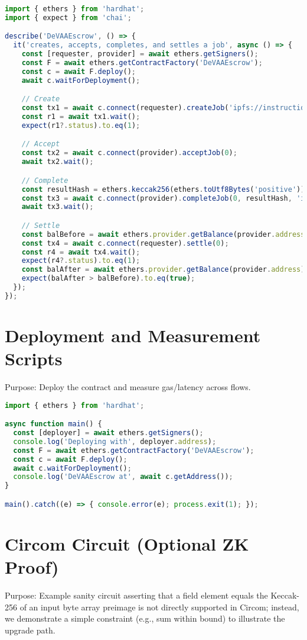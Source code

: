 \begin{lstlisting}[language=TypeScript,caption={test/devAA.test.ts}]
import { ethers } from 'hardhat';
import { expect } from 'chai';

describe('DeVAAEscrow', () => {
  it('creates, accepts, completes, and settles a job', async () => {
    const [requester, provider] = await ethers.getSigners();
    const F = await ethers.getContractFactory('DeVAAEscrow');
    const c = await F.deploy();
    await c.waitForDeployment();

    // Create
    const tx1 = await c.connect(requester).createJob('ipfs://instructions', { value: ethers.parseEther('0.01') });
    const r1 = await tx1.wait();
    expect(r1?.status).to.eq(1);

    // Accept
    const tx2 = await c.connect(provider).acceptJob(0);
    await tx2.wait();

    // Complete
    const resultHash = ethers.keccak256(ethers.toUtf8Bytes('positive'));
    const tx3 = await c.connect(provider).completeJob(0, resultHash, 'ipfs://artifact');
    await tx3.wait();

    // Settle
    const balBefore = await ethers.provider.getBalance(provider.address);
    const tx4 = await c.connect(requester).settle(0);
    const r4 = await tx4.wait();
    expect(r4?.status).to.eq(1);
    const balAfter = await ethers.provider.getBalance(provider.address);
    expect(balAfter > balBefore).to.eq(true);
  });
});
\end{lstlisting}

\section{Deployment and Measurement Scripts}
\noindent Purpose: Deploy the contract and measure gas/latency across flows.

\begin{lstlisting}[language=TypeScript,caption={scripts/deploy.ts}]
import { ethers } from 'hardhat';

async function main() {
  const [deployer] = await ethers.getSigners();
  console.log('Deploying with', deployer.address);
  const F = await ethers.getContractFactory('DeVAAEscrow');
  const c = await F.deploy();
  await c.waitForDeployment();
  console.log('DeVAAEscrow at', await c.getAddress());
}

main().catch((e) => { console.error(e); process.exit(1); });
\end{lstlisting}

\section{Circom Circuit (Optional ZK Proof)}
\noindent Purpose: Example sanity circuit asserting that a field element equals the Keccak-256 of an input byte array preimage is not directly supported in Circom; instead, we demonstrate a simple constraint (e.g., sum within bound) to illustrate the upgrade path.

